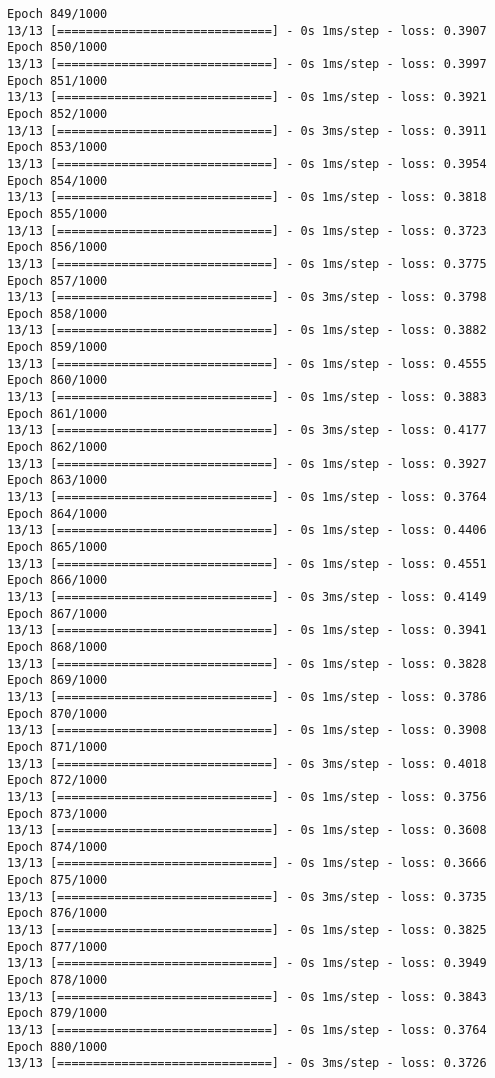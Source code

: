 \documentclass[11pt]{article}
\begin{document}
\begin{Verbatim}[commandchars=\\\{\}]
Epoch 849/1000
13/13 [==============================] - 0s 1ms/step - loss: 0.3907
Epoch 850/1000
13/13 [==============================] - 0s 1ms/step - loss: 0.3997
Epoch 851/1000
13/13 [==============================] - 0s 1ms/step - loss: 0.3921
Epoch 852/1000
13/13 [==============================] - 0s 3ms/step - loss: 0.3911
Epoch 853/1000
13/13 [==============================] - 0s 1ms/step - loss: 0.3954
Epoch 854/1000
13/13 [==============================] - 0s 1ms/step - loss: 0.3818
Epoch 855/1000
13/13 [==============================] - 0s 1ms/step - loss: 0.3723
Epoch 856/1000
13/13 [==============================] - 0s 1ms/step - loss: 0.3775
Epoch 857/1000
13/13 [==============================] - 0s 3ms/step - loss: 0.3798
Epoch 858/1000
13/13 [==============================] - 0s 1ms/step - loss: 0.3882
Epoch 859/1000
13/13 [==============================] - 0s 1ms/step - loss: 0.4555
Epoch 860/1000
13/13 [==============================] - 0s 1ms/step - loss: 0.3883
Epoch 861/1000
13/13 [==============================] - 0s 3ms/step - loss: 0.4177
Epoch 862/1000
13/13 [==============================] - 0s 1ms/step - loss: 0.3927
Epoch 863/1000
13/13 [==============================] - 0s 1ms/step - loss: 0.3764
Epoch 864/1000
13/13 [==============================] - 0s 1ms/step - loss: 0.4406
Epoch 865/1000
13/13 [==============================] - 0s 1ms/step - loss: 0.4551
Epoch 866/1000
13/13 [==============================] - 0s 3ms/step - loss: 0.4149
Epoch 867/1000
13/13 [==============================] - 0s 1ms/step - loss: 0.3941
Epoch 868/1000
13/13 [==============================] - 0s 1ms/step - loss: 0.3828
Epoch 869/1000
13/13 [==============================] - 0s 1ms/step - loss: 0.3786
Epoch 870/1000
13/13 [==============================] - 0s 1ms/step - loss: 0.3908
Epoch 871/1000
13/13 [==============================] - 0s 3ms/step - loss: 0.4018
Epoch 872/1000
13/13 [==============================] - 0s 1ms/step - loss: 0.3756
Epoch 873/1000
13/13 [==============================] - 0s 1ms/step - loss: 0.3608
Epoch 874/1000
13/13 [==============================] - 0s 1ms/step - loss: 0.3666
Epoch 875/1000
13/13 [==============================] - 0s 3ms/step - loss: 0.3735
Epoch 876/1000
13/13 [==============================] - 0s 1ms/step - loss: 0.3825
Epoch 877/1000
13/13 [==============================] - 0s 1ms/step - loss: 0.3949
Epoch 878/1000
13/13 [==============================] - 0s 1ms/step - loss: 0.3843
Epoch 879/1000
13/13 [==============================] - 0s 1ms/step - loss: 0.3764
Epoch 880/1000
13/13 [==============================] - 0s 3ms/step - loss: 0.3726

\end{Verbatim}
\end{document}

